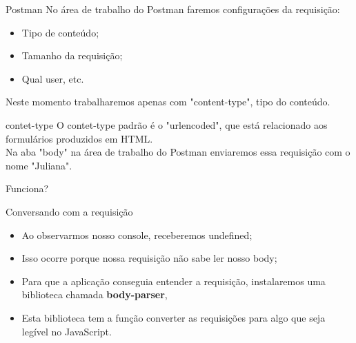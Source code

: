 \documentclass{beamer}
\begin{document}
    \begin{frame}[label=lists]{Postman}
   No área de trabalho do Postman faremos configurações da requisição: 
   \begin{itemize}
       \item Tipo de conteúdo;
       \item Tamanho da requisição;
       \item Qual user, etc.
       \end{itemize}
       Neste momento trabalharemos apenas com "content-type",  tipo do conteúdo.
	\begin{alertblock}{contet-type}
		O contet-type padrão é o "urlencoded", que está relacionado aos formulários produzidos em HTML. \\
	Na aba "body" na área de trabalho do Postman enviaremos essa requisição com o nome "Juliana".
	\end{alertblock}
    \end{frame}
    \begin{frame}[label=lists]{Funciona?}
	\begin{exampleblock}{Conversando com a requisição}
	\begin{itemize}
	\item Ao observarmos nosso console, receberemos \alert{undefined};
	\item Isso ocorre porque nossa requisição não sabe ler nosso body;
	\item Para que a aplicação conseguia entender a requisição, instalaremos uma biblioteca chamada \textbf{body-parser}, 
	\item Esta biblioteca tem a função converter as requisições para algo que seja legível no JavaScript.
	\end{itemize}
	\end{exampleblock}
    \end{frame}
   
\end{document}
